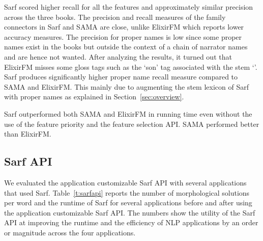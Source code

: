 Sarf scored higher recall for all the features and approximately 
similar precision across the three books. 
The precision and recall measures of the family connectors 
in Sarf and SAMA are close, unlike ElixirFM which reports 
lower accuracy measures. 
The precision for proper names is low since some proper names exist 
in the books but outside the context of a chain of narrator names
and are hence not wanted. 
After analyzing the results, it turned out that  ElixirFM
misses some gloss tags such as the `son' tag associated with the stem `'.
Sarf produces significantly higher proper name recall measure 
compared to SAMA and ElixirFM. This mainly due to augmenting the stem lexicon of 
Sarf with proper names as explained in Section~\ref{sec:overview}.

Sarf outperformed both SAMA and ElixirFM in running time even without the 
use of the feature priority and the feature selection API. 
SAMA performed better than ElixirFM. 


%



\subsection{Sarf API}



We evaluated the application customizable Sarf API with several applications that
used Sarf. 
Table~\ref{t:sarfapi} reports the number of morphological solutions per word 
and the runtime of Sarf for several applications before and after using the application customizable Sarf API.
The numbers show the utility of the Sarf API at improving the runtime and the efficiency of 
NLP applications by an order or magnitude across the four applications. 

